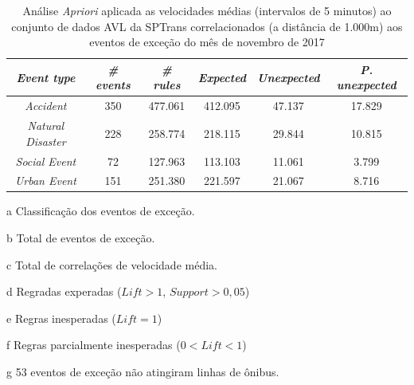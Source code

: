 \documentclass[
	12pt,				%
	oneside,			%
	a4paper,			%
	english,			%
	brazil				%
	]{abntex2ppgsi}
\begin{document}
\begin{apendicesenv}
\begin{table}[!htb]
\centering
\begin{threeparttable}
\caption {Análise \textit{Apriori} aplicada as velocidades médias (intervalos de 5 minutos) ao conjunto de dados AVL da SPTrans correlacionados (a distância de 1.000m) aos eventos de exceção do mês de novembro de 2017}
\label {tab:aprioriFull}
\begin{tabular}{c|c|c|c|c|c}
\hline
\textbf{\textit{Event type}}\tnote{a} & \textbf{\textit{\# events}}\tnote{b} & \textit{\textbf{\# rules}}\tnote{c} & \textbf{\textit{Expected}}\tnote{d} & \textbf{\textit{Unexpected}}\tnote{e} & \textbf{\textit{P. unexpected}}\tnote{f}   \\
\hline
\textit{Accident} & 350 & 477.061 & 412.095 & 47.137 & 17.829 \\
\textit{Natural Disaster} & 228 & 258.774 & 218.115 & 29.844 & 10.815 \\
\textit{Social Event} & 72 & 127.963 & 113.103 & 11.061 & 3.799 \\
\textit{Urban Event} & 151 & 251.380 & 221.597 & 21.067 & 8.716 \\
\hline
\end{tabular}
\begin{tablenotes}
            \item[a] Classificação dos eventos de exceção.
            \item[b] Total de eventos de exceção.
            \item[c] Total de correlações de velocidade média.
            \item[d] Regradas experadas ($Lift > 1$, $Support > 0,05$)
            \item[e] Regras inesperadas ($Lift = 1$)
            \item[f] Regras parcialmente inesperadas ($0 < Lift < 1$)
            \item[g] 53 eventos de exceção não atingiram linhas de ônibus.
        \end{tablenotes}
\end{threeparttable}
\end{table}


\end{apendicesenv}
\end{document}
